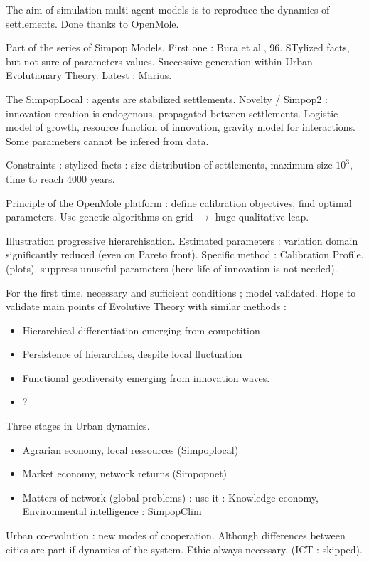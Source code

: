 The aim of simulation multi-agent models is to reproduce the dynamics of settlements. Done thanks to OpenMole.

Part of the series of Simpop Models. First one : Bura et al., 96. STylized facts, but not sure of parameters values. Successive generation within Urban Evolutionary Theory. Latest : Marius.

The SimpopLocal : agents are stabilized settlements. Novelty / Simpop2 : innovation creation is endogenous. propagated between settlements. Logistic model of growth, resource function of innovation, gravity model for interactions. Some parameters cannot be infered from data.

Constraints : stylized facts : size distribution of settlements, maximum size $10^3$, time to reach 4000 years.

Principle of the OpenMole platform : define calibration objectives, find optimal parameters. Use genetic algorithms on grid $\rightarrow$ huge qualitative leap.

Illustration progressive hierarchisation. Estimated parameters : variation domain significantly reduced (even on Pareto front). Specific method : Calibration Profile. (plots). suppress unuseful parameters (here life of innovation is not needed).

For the first time, necessary and sufficient conditions ; model validated. Hope to validate main points of Evolutive Theory with similar methods :
\begin{itemize}
\item Hierarchical differentiation emerging from competition
\item Persistence of hierarchies, despite local fluctuation
\item Functional geodiversity emerging from innovation waves.
\item ?
\end{itemize}

Three stages in Urban dynamics.
\begin{itemize}
\item Agrarian economy, local ressources (Simpoplocal)
\item Market economy, network returns (Simpopnet)
\item Matters of network (global problems) : use it : Knowledge economy, Environmental intelligence : SimpopClim
\end{itemize}

Urban co-evolution : new modes of cooperation.
Although differences between cities are part if dynamics of the system.
Ethic always necessary.
(ICT : skipped).

